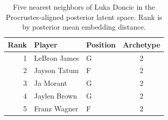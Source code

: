 \begin{table}[htbp]
  \centering\small
  \begin{tabular}{rllc}
    \toprule
    Rank & Player & Position & Archetype \\
    \midrule
    1 & LeBron James & G & 2 \\
    2 & Jayson Tatum & F & 2 \\
    3 & Ja Morant & G & 2 \\
    4 & Jaylen Brown & G & 2 \\
    5 & Franz Wagner & F & 2 \\
    \bottomrule
  \end{tabular}
  \caption{Five nearest neighbors of Luka Doncic in the Procrustes-aligned posterior latent space. Rank is by posterior mean embedding distance.}
  \label{tab:Luka_Doncic_neighbors}
\end{table}

